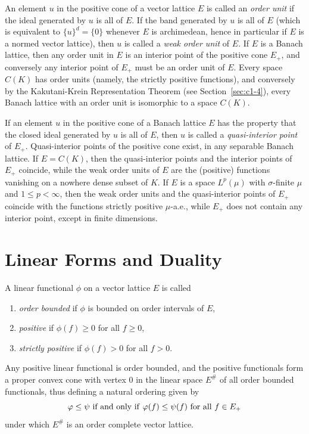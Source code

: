An element $ u $ in the positive cone of a vector lattice $ E $ is called an \emph{order unit} if the ideal generated by $ u $ is all of\/ $ E $.
If the band generated by $ u $ is all of\/ $ E $ (which is equivalent to $ \{u\}^{d} = \{0\} $ whenever $ E $ is archimedean, hence in particular if\/ $ E $ is a normed vector lattice), then $ u $ is called a \emph{weak order unit} of\/ $ E $.
If\/ $ E $ is a Banach lattice, then any order unit in $ E $ is an interior point of the positive cone $ E_{+} $, and conversely any interior point of\/ $ E_{+} $ must be an order unit of\/ $ E $.
Every space $ C(K) $ has order units (namely, the strictly positive functions), and conversely by the Kakutani-Krein Representation Theorem (see Section~\ref{sec:c1-4}), every Banach lattice with an order unit is isomorphic to a space $ C(K) $.

If an element $ u $ in the positive cone of a Banach lattice $ E $ has the property that the closed ideal generated by $ u $ is all of\/ $ E $, then $ u $ is called a \emph{quasi-interior point} of\/ $ E_{+} $.
Quasi-interior points of the positive cone exist, \eg in any separable Banach lattice.
If\/ $ E = C(K) $, then the quasi-interior points and the interior points of\/ $ E_{+} $ coincide, while the weak order units of\/ $ E $ are the (positive) functions vanishing on a nowhere dense subset of\/ $ K $.
If\/ $ E $ is a space $ L^{p}(\mu) $ with $ \sigma $-finite $ \mu $ and $ 1 \leq p < \infty $, then the weak order units and the quasi-interior points of\/ $ E_{+} $ coincide with the functions strictly positive $ \mu $-a.e., while $ E_{+} $ does not contain any interior point, except in finite dimensions.
\section{Linear Forms and Duality}\label{sec:c1-3}%
A linear functional $ \phi $ on a vector lattice $ E $ is called
\begin{enumerate}[\upshape (i)]

\item
\emph{order bounded} if\/ $ \phi $ is bounded on order intervals of\/ $ E $,

\item
\emph{positive} if\/ $ \phi(f) \geq 0 $ for all  $ f \geq 0 $, 

\item
\emph{strictly positive} if\/ $ \phi(f) > 0 $ for all  $ f > 0 $.

\end{enumerate}
Any positive linear functional is order bounded, and the positive functionals form a proper convex cone with vertex $ 0 $ in the linear space $ E^{\#} $ of all order bounded functionals, thus defining a natural
ordering given by 
%
\[
	\text{$ \phi \leq \psi $ if and only if\/ $ \phi(f) \leq \psi(f) $ for all $ f \in E_{+} $}
\]
%
under which $ E^{\#} $ is an order complete vector lattice.

